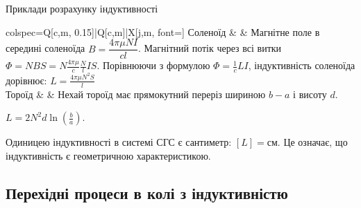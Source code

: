 \documentclass[onlytextwidth]{beamer}
\begin{document}
\begin{frame}{Приклади розрахунку індуктивності}{}
	\begin{tblr}{colspec={Q[c,m, 0.15\linewidth]|Q[c,m]|X[j,m, font=\small]}}
		Соленоїд
		 &
		 &
		Магнітне поле в середині соленоїда $B = \dfrac{4\pi\mu NI}{c l}$. Магнітний потік через всі витки
		$\Phi = NBS =  N \frac{4\pi\mu}c\frac{N}{l} I S$. Порівнюючи з формулою $\Phi = \frac1c LI$, індуктивність соленоїда дорівнює: $L =
			\frac{4\pi\mu
				N^2 S}{l}$
		\\\hline
		Тороїд
		 &
		 &
		Нехай тороїд має прямокутний переріз шириною $b-a$ і висоту $d$.

		$L = 2N^2d\ln\left( \frac{b}{a}\right) $.
	\end{tblr}
	\begin{block}{}\justifying
		Одиницею індуктивності в системі СГС є сантиметр: $[L] = \text{см}$. Це означає, що індуктивність є \alert{геометричною} характеристикою.
	\end{block}
\end{frame}



\subsection{Перехідні процеси в колі з індуктивністю}
\end{document}
